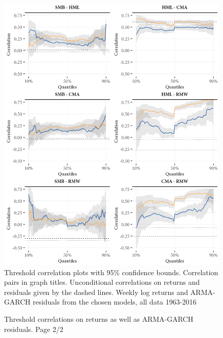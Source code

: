 \begin{figure}[H]
  \caption{Threshold correlations on returns as well as ARMA-GARCH residuals. Page 2/2}
  \label{fig:appendix_threshold2}
  \centering
  \begin{minipage}{\textwidth}
  \includegraphics[scale=1]{graphics/appendix_threshold2.png}  
  \vspace{3mm}
  \footnotesize
  Threshold correlation plots with 95\% confidence bounds. Correlation pairs in graph titles. Unconditional correlations on returns and residuals given by the dashed lines. Weekly log returns and ARMA-GARCH residuals from the chosen models, all data 1963-2016
  \end{minipage}
\end{figure}

\newpage


